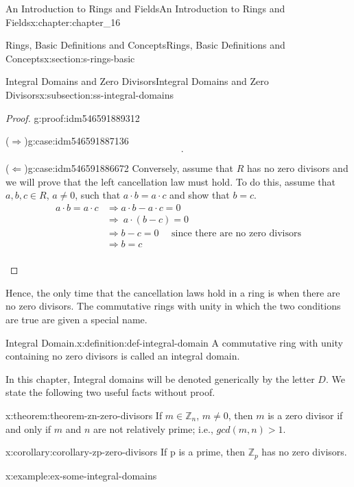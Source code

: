 \documentclass[oneside,10pt,]{book}
\newcommand{\forwardimplication}{($\Rightarrow$)}
\newcommand{\backwardimplication}{($\Leftarrow$)}
\numberwithin{equation}{section}
\newcommand{\gt}{>}
\begin{document}
\begin{chapterptx}{An Introduction to Rings and Fields}{}{An Introduction to Rings and Fields}{}{}{x:chapter:chapter_16}
\begin{sectionptx}{Rings, Basic Definitions and Concepts}{}{Rings, Basic Definitions and Concepts}{}{}{x:section:s-rings-basic}
\begin{subsectionptx}{Integral Domains and Zero Divisors}{}{Integral Domains and Zero Divisors}{}{}{x:subsection:ss-integral-domains}
\begin{proof}{}{g:proof:idm546591889312}
\begin{case}{\forwardimplication}{}{g:case:idm546591887136}
\begin{equation*}
\begin{split}
\end{split}\text{.}
\end{equation*}
%
\end{case}
\begin{case}{\backwardimplication}{}{g:case:idm546591886672}
Conversely, assume that \(R\) has no zero divisors and we will prove that the left cancellation law must hold. To do this, assume that \(a,b, c \in  R\), \(a \neq  0\), such that \(a \cdot  b = a \cdot  c\) and show that \(b = c\).%
\begin{equation*}
\begin{split}
a \cdot  b = a \cdot  c & \Rightarrow  a \cdot  b - a \cdot  c=0\\
&\Rightarrow\ a\cdot (b-c) =0\\
& \Rightarrow  b-c = 0\quad \textrm{   since there are no zero divisors}\\
&\Rightarrow b=c\\
\end{split}
\end{equation*}
%
\par
%
\end{case}
\end{proof}
Hence, the only time that the cancellation laws hold in a ring is when there are no zero divisors. The commutative rings with unity in which the two conditions are true are given a special name.%
\begin{definition}{Integral Domain.}{x:definition:def-integral-domain}%
%
\label{g:notation:idm546591877024}%
A commutative ring with unity containing no zero divisors is called an integral domain.%
\end{definition}
In this chapter, Integral domains will be denoted generically by the letter \(D\). We state the following two useful facts without proof.%
\begin{theorem}{}{}{x:theorem:theorem-zn-zero-divisors}%
If \(m \in \mathbb{Z}_n\), \(m\neq 0\), then \(m\) is a zero divisor if and only if \(m\) and \(n\) are not relatively prime; i.e., \(gcd(m, n) \gt  1\).%
\end{theorem}
\begin{corollary}{}{}{x:corollary:corollary-zp-zero-divisors}%
If p is a prime, then \(\mathbb{Z}_p\) has no zero divisors.%
\end{corollary}
\begin{example}{}{x:example:ex-some-integral-domains}%

\end{example}
\end{subsectionptx}
\end{sectionptx}
\end{chapterptx}
\end{document}

